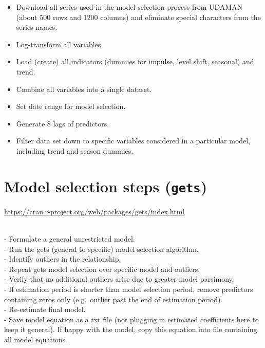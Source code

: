 \documentclass[
  letterpaper,
  DIV=11,
  numbers=noendperiod]{scrreport}
\providecommand{\tightlist}{%
  \setlength{\itemsep}{0pt}\setlength{\parskip}{0pt}}\usepackage{longtable,booktabs,array}
\begin{document}
\begin{itemize}
\tightlist
\item
  Download all series used in the model selection process from UDAMAN
  (about 500 rows and 1200 columns) and eliminate special characters
  from the series names.\\
\item
  Log-transform all variables.\\
\item
  Load (create) all indicators (dummies for impulse, level shift,
  seasonal) and trend.\\
\item
  Combine all variables into a single dataset.\\
\item
  Set date range for model selection.\\
\item
  Generate 8 lags of predictors.\\
\item
  Filter data set down to specific variables considered in a particular
  model, including trend and season dummies.
\end{itemize}

\hypertarget{model-selection-steps-gets}{%
\section{\texorpdfstring{Model selection steps
(\texttt{gets})}{Model selection steps (gets)}}\label{model-selection-steps-gets}}

\url{https://cran.r-project.org/web/packages/gets/index.html}\strut \\
- Formulate a general unrestricted model.\\
- Run the gets (general to specific) model selection algorithm.\\
- Identify outliers in the relationship.\\
- Repeat gets model selection over specific model and outliers.\\
- Verify that no additional outliers arise due to greater model
parsimony.\\
- If estimation period is shorter than model selection period, remove
predictors containing zeros only (e.g.~outlier past the end of
estimation period).\\
- Re-estimate final model.\\
- Save model equation as a txt file (not plugging in estimated
coefficients here to keep it general). If happy with the model, copy
this equation into file containing all model equations.
\end{document}
